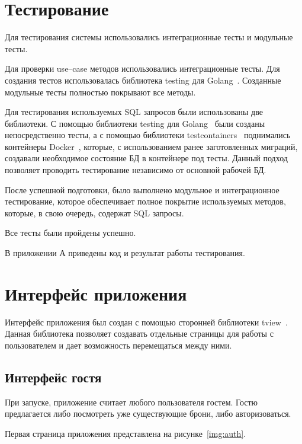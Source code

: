 \section{Тестирование}
Для тестирования системы использовались интеграционные тесты и модульные тесты.

Для проверки use--case методов использовались интеграционные тесты.
Для создания тестов использовалась библиотека testing для Golang~\cite{golang_testing}.
Созданные модульные тесты полностью покрывают все методы.

Для тестирования используемых SQL запросов были использованы две библиотеки.
С помощью библиотеки testing для Golang~\cite{golang_testing} были созданы непосредственно тесты, а с помощью библиотеки testcontainers~\cite{golang_testcontainers} поднимались контейнеры Docker~\cite{docker}, которые, с использованием ранее заготовленных миграций, создавали необходимое состояние БД в контейнере под тесты.
Данный подход позволяет проводить тестирование независимо от основной рабочей БД.

После успешной подготовки, было выполнено модульное и интеграционное тестирование, которое обеспечивает полное покрытие используемых методов, которые, в свою очередь, содержат SQL запросы.

Все тесты были пройдены успешно.

В приложении А приведены код и результат работы тестирования. 

\section{Интерфейс приложения}
Интерфейс приложения был создан с помощью сторонней библиотеки tview~\cite{golang_tview}.
Данная библиотека позволяет создавать отдельные страницы для работы с пользователем и дает возможность перемещаться между ними. 

\subsection{Интерфейс гостя}

При запуске, приложение считает любого пользователя гостем. 
Гостю предлагается либо посмотреть уже существующие брони, либо авторизоваться.

Первая страница приложения представлена на рисунке~\ref{img:auth}.



